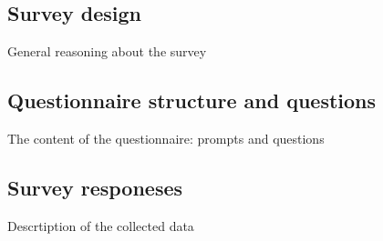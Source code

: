 
\subsection{Survey design}
General reasoning about the survey

\subsection{Questionnaire structure and questions}
The content of the questionnaire: prompts and questions

\subsection{Survey responeses}
Descrtiption of the collected data
